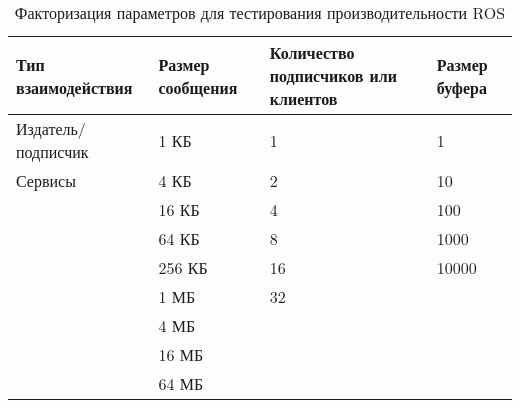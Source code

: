 \begin{table}[]
	\centering
	\def\arraystretch{1.3}
	\caption{Факторизация параметров для тестирования производительности ROS}
	\label{table:chapter2:ros_test_cases}
		\begin{tabular}{|p{4cm}|p{3cm}|p{6cm}|p{2cm}|}
		\hline
		\textbf{Тип взаимодействия} & \textbf{Размер сообщения} & \textbf{Количество подписчиков или клиентов} & \textbf{Размер буфера}     \\ \hline
		Издатель/ подписчик & 1 КБ        & 1                  & 1                \\ \hline
		Сервисы             & 4 КБ        & 2                  & 10               \\ \hline
		\multirow{8}{*}{}   & 16 КБ       & 4                  & 100              \\ \cline{2-4} 
		                    & 64 КБ       & 8                  & 1000              \\ \cline{2-4} 
		                    & 256 КБ      & 16                 & 10000              \\ \cline{2-4} 
		                    & 1 МБ        & 32                 & \multirow{5}{*}{} \\ \cline{2-2} 
		                    & 4 МБ        & \multirow{4}{*}{}  &                   \\ \cline{2-2}
		                    & 16 МБ       &                    &                   \\ \cline{2-2}
		                    & 64 МБ       &                    &                   \\ \hline           
		\end{tabular}%
\end{table}